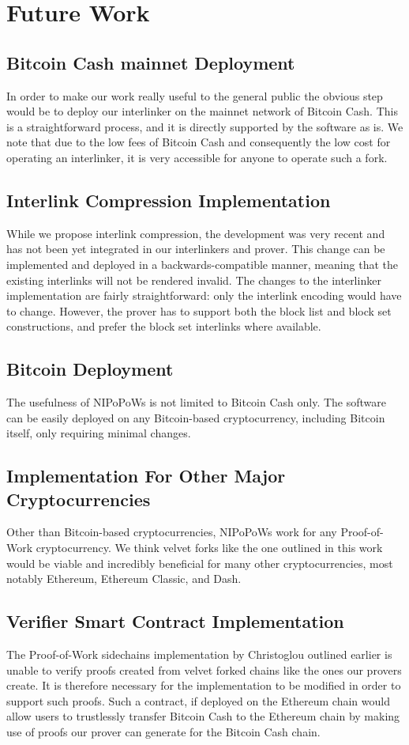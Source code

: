 \section{Future Work}
\subsection{Bitcoin Cash mainnet Deployment}
In order to make our work really useful to the general public the obvious step would be to deploy our interlinker on the mainnet network of Bitcoin Cash. This is a straightforward process, and it is directly supported by the software as is. We note that due to the low fees of Bitcoin Cash and consequently the low cost for operating an interlinker, it is very accessible for anyone to operate such a fork.

\subsection{Interlink Compression Implementation}
While we propose interlink compression, the development was very recent and has not been yet integrated in our interlinkers and prover. This change can be implemented and deployed in a backwards-compatible manner, meaning that the existing interlinks will not be rendered invalid. The changes to the interlinker implementation are fairly straightforward: only the interlink encoding would have to change. However, the prover has to support both the block list and block set constructions, and prefer the block set interlinks where available.

\subsection{Bitcoin Deployment}
The usefulness of NIPoPoWs is not limited to Bitcoin Cash only. The software can be easily deployed on any Bitcoin-based cryptocurrency, including Bitcoin itself, only requiring minimal changes.

\subsection{Implementation For Other Major Cryptocurrencies}
Other than Bitcoin-based cryptocurrencies, NIPoPoWs work for any Proof-of-Work cryptocurrency. We think velvet forks like the one outlined in this work would be viable and incredibly beneficial for many other cryptocurrencies, most notably Ethereum, Ethereum Classic, and Dash.

\subsection{Verifier Smart Contract Implementation}
The Proof-of-Work sidechains implementation by Christoglou \cite{christoglou} outlined earlier is unable to verify proofs created from velvet forked chains like the ones our provers create. It is therefore necessary for the implementation to be modified in order to support such proofs. Such a contract, if deployed on the Ethereum chain would allow users to trustlessly transfer Bitcoin Cash to the Ethereum chain by making use of proofs our prover can generate for the Bitcoin Cash chain.
